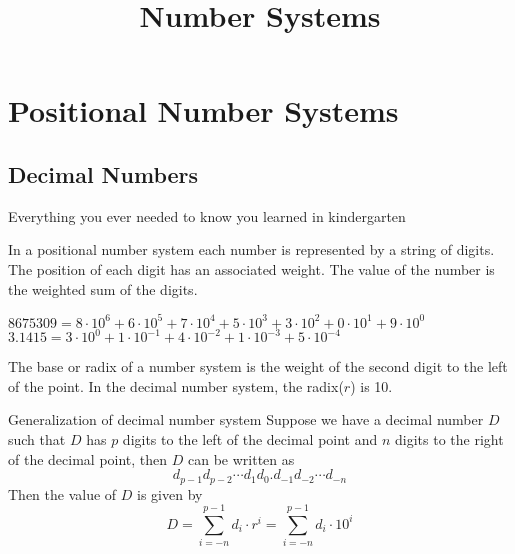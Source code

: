 \title{Number Systems}


\section{Positional Number Systems}

\subsection{Decimal Numbers}

\begin{frame}{Everything you ever needed to know you learned in kindergarten}
  \begin{definition}
    In a \alert{positional number system} each number is represented by a string of digits.  The position of each digit has an associated weight.  The value of the number is the weighted sum of the digits.
  \end{definition}
  \begin{example}
    $8675309 = 8\cdot10^6+6\cdot10^5+7\cdot10^4+5\cdot10^3+3\cdot10^2+0\cdot10^1+9\cdot10^0$
    $3.1415 = 3\cdot10^0+1\cdot10^{-1}+4\cdot10^{-2}+1\cdot10^{-3}+5\cdot10^{-4}$
  \end{example}
  \begin{definition}
    The \alert{base} or \alert{radix} of a number system is the weight of the second digit to the left of the point.  In the decimal number system, the radix($r$) is 10.
  \end{definition}
\end{frame}

\begin{frame}{Generalization of decimal number system}
  Suppose we have a decimal number $D$ such that $D$ has $p$ digits to the left of the decimal point and $n$ digits to the right of the decimal point, then $D$ can be written as
  $$d_{p-1} d_{p-2} \cdots d_1 d_0 . d_{-1} d_{-2} \cdots d_{-n}$$
  Then the value of $D$ is given by
  $$D=\sum_{i=-n}^{p-1}d_i \cdot r^i = \sum_{i=-n}^{p-1}d_i \cdot 10^i$$
\end{frame}

